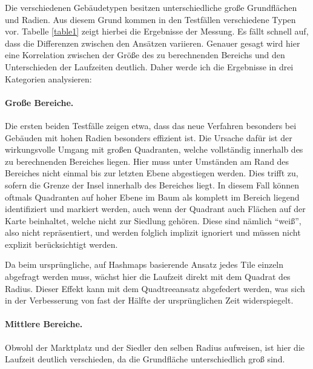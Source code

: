 \documentclass[%
			paper=a4,%
			DIV12,
			liststotoc,
			bibtotoc,
			draft=false,%
			titlepage,
			numbers=noendperiod
			]{scrartcl}
\begin{document}
Die verschiedenen Gebäudetypen besitzen unterschiedliche große Grundflächen und Radien.
Aus diesem Grund kommen in den Testfällen verschiedene Typen vor.
Tabelle \ref{table1} zeigt hierbei die Ergebnisse der Messung.
Es fällt schnell auf, dass die Differenzen zwischen den Ansätzen variieren.
Genauer gesagt wird hier eine Korrelation zwischen der Größe des zu berechnenden Bereichs und den Unterschieden der Laufzeiten deutlich. Daher werde ich die Ergebnisse in drei Kategorien analysieren:

\paragraph{Große Bereiche.}
Die ersten beiden Testfälle zeigen etwa, dass das neue Verfahren besonders bei Gebäuden mit hohen Radien besonders effizient ist.
Die Ursache dafür ist der wirkungsvolle Umgang mit großen Quadranten, welche vollständig innerhalb des zu berechnenden Bereiches liegen.
Hier muss unter Umständen am Rand des Bereiches nicht einmal bis zur letzten Ebene abgestiegen werden.
Dies trifft zu, sofern die Grenze der Insel innerhalb des Bereiches liegt.
In diesem Fall können oftmals Quadranten auf hoher Ebene im Baum als komplett im Bereich liegend identifiziert und markiert werden, auch wenn der Quadrant auch Flächen auf der Karte beinhaltet, welche nicht zur Siedlung gehören.
Diese sind nämlich "`weiß"', also nicht repräsentiert, und werden folglich implizit ignoriert und müssen nicht explizit berücksichtigt werden.

Da beim ursprüngliche, auf Hashmaps basierende Ansatz jedes Tile einzeln abgefragt werden muss, wächst hier die Laufzeit direkt mit dem Quadrat des Radius. Dieser Effekt kann mit dem Quadtreeansatz abgefedert werden, was sich in der Verbesserung von fast der Hälfte der ursprünglichen Zeit widerspiegelt.

\paragraph{Mittlere Bereiche.}
Obwohl der Marktplatz und der Siedler den selben Radius aufweisen, ist hier die Laufzeit deutlich verschieden, da die Grundfläche unterschiedlich groß sind.
\end{document}
